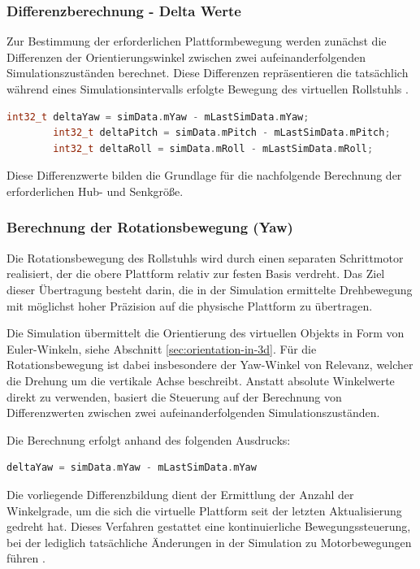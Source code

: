 \subsubsection{Differenzberechnung - Delta Werte}
Zur Bestimmung der erforderlichen Plattformbewegung werden zunächst die Differenzen der Orientierungswinkel zwischen zwei aufeinanderfolgenden Simulationszuständen berechnet. Diese Differenzen repräsentieren die tatsächlich während eines Simulationsintervalls erfolgte Bewegung des virtuellen Rollstuhls \cite{Astrom2021}.
\begin{lstlisting}[language=C++, caption={Differenzberechnung der Orientierungswinkel}, label={lst:delta_values}]
        int32_t deltaYaw = simData.mYaw - mLastSimData.mYaw;
        int32_t deltaPitch = simData.mPitch - mLastSimData.mPitch;
        int32_t deltaRoll = simData.mRoll - mLastSimData.mRoll;

\end{lstlisting}
Diese Differenzwerte bilden die Grundlage für die nachfolgende Berechnung der erforderlichen Hub- und Senkgröße.

\subsubsection{Berechnung der Rotationsbewegung (Yaw)}
Die Rotationsbewegung des Rollstuhls wird durch einen separaten Schrittmotor realisiert, der die obere Plattform relativ zur festen Basis verdreht. Das Ziel dieser Übertragung besteht darin, die in der Simulation ermittelte Drehbewegung mit möglichst hoher Präzision auf die physische Plattform zu übertragen.

Die Simulation übermittelt die Orientierung des virtuellen Objekts in Form von Euler-Winkeln, siehe Abschnitt \ref{sec:orientation-in-3d}. Für die Rotationsbewegung ist dabei insbesondere der Yaw-Winkel von Relevanz, welcher die Drehung um die vertikale Achse beschreibt. Anstatt absolute Winkelwerte direkt zu verwenden, basiert die Steuerung auf der Berechnung von Differenzwerten zwischen zwei aufeinanderfolgenden Simulationszuständen.

Die Berechnung erfolgt anhand des folgenden Ausdrucks:
\begin{lstlisting}[language=C++, caption={Differenzberechnung der Rotation}, label={lst:yaw_calculation}]
        deltaYaw = simData.mYaw - mLastSimData.mYaw
\end{lstlisting}
Die vorliegende Differenzbildung dient der Ermittlung der Anzahl der Winkelgrade, um die sich die virtuelle Plattform seit der letzten Aktualisierung gedreht hat. Dieses Verfahren gestattet eine kontinuierliche Bewegungssteuerung, bei der lediglich tatsächliche Änderungen in der Simulation zu Motorbewegungen führen \cite{Astrom2021}.

